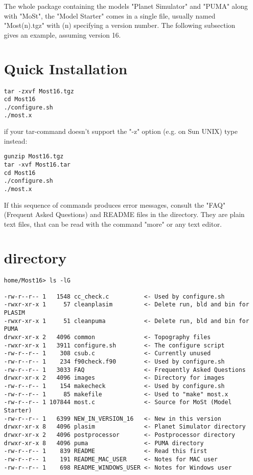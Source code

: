 The whole package containing the models "Planet Simulator" and "PUMA"
along with "MoSt", the "Model Starter" comes in a single file,
usually named "Most(n).tgz" with (n) specifying a version number.
The following subsection gives an example, assuming version 16.

\section{Quick Installation}

\begin{verbatim}
tar -zxvf Most16.tgz
cd Most16
./configure.sh
./most.x
\end{verbatim}

if your tar-command doesn't support the "-z" option (e.g. on Sun UNIX)
type instead:

\begin{verbatim}
gunzip Most16.tgz
tar -xvf Most16.tar
cd Most16
./configure.sh
./most.x
\end{verbatim}

If this sequence of commands produces error messages,
consult the "FAQ" (Frequent Asked Questions) and README files
in the {\most} directory. They are plain text files,
that can be read with the command "more" or any text editor.

\section{{\most}  directory }

\begin{verbatim}
home/Most16> ls -lG

-rw-r--r-- 1   1548 cc_check.c          <- Used by configure.sh
-rwxr-xr-x 1     57 cleanplasim         <- Delete run, bld and bin for PLASIM
-rwxr-xr-x 1     51 cleanpuma           <- Delete run, bld and bin for PUMA
drwxr-xr-x 2   4096 common              <- Topography files
-rwxr-xr-x 1   3911 configure.sh        <- The configure script
-rw-r--r-- 1    308 csub.c              <- Currently unused
-rw-r--r-- 1    234 f90check.f90        <- Used by configure.sh
-rw-r--r-- 1   3033 FAQ                 <- Frequently Asked Questions
drwxr-xr-x 2   4096 images              <- Directory for images
-rw-r--r-- 1    154 makecheck           <- Used by configure.sh
-rw-r--r-- 1     85 makefile            <- Used to "make" most.x
-rw-r--r-- 1 107844 most.c              <- Source for MoSt (Model Starter)
-rw-r--r-- 1   6399 NEW_IN_VERSION_16   <- New in this version
drwxr-xr-x 8   4096 plasim              <- Planet Simulator directory
drwxr-xr-x 2   4096 postprocessor       <- Postprocessor directory
drwxr-xr-x 8   4096 puma                <- PUMA directory
-rw-r--r-- 1    839 README              <- Read this first
-rw-r--r-- 1    191 README_MAC_USER     <- Notes for MAC user
-rw-r--r-- 1    698 README_WINDOWS_USER <- Notes for Windows user
\end{verbatim}

